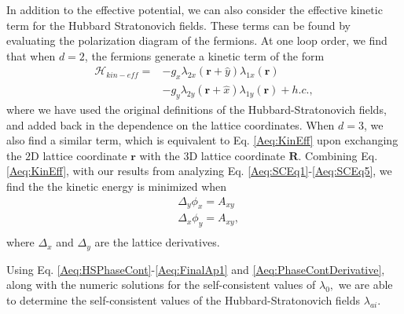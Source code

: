\documentclass[prb,aps,twocolumn,groupaddress,floatfix]{revtex4-1}
\begin{document}
In addition to the effective potential, we can also consider the effective kinetic term for the Hubbard Stratonovich fields. These terms can be found by evaluating the polarization diagram of the fermions. At one loop order, we find that when $d=2$, the fermions generate a kinetic term of the form
\begin{equation}\begin{split}
\mathcal{H}_{kin-eff} = &-g_x \lambda_{2x}(\bm{r}+\hat{y}) \lambda_{1x}(\bm{r}) \\ &- g_y \lambda_{2y}(\bm{r}+\hat{x}) \lambda_{1y}(\bm{r}) + h.c.,
\end{split}\label{Aeq:KinEff}
\end{equation}
where we have used the original definitions of the Hubbard-Stratonovich fields, and added back in the dependence on the lattice coordinates. When $d=3$, we also find a similar term, which is equivalent to Eq. \ref{Aeq:KinEff} upon exchanging the $2$D lattice coordinate $\bm{r}$ with the $3$D lattice coordinate $\bm{R}$. Combining Eq. \ref{Aeq:KinEff}, with our results from analyzing Eq. \ref{Aeq:SCEq1}-\ref{Aeq:SCEq5}, we find the the kinetic energy is minimized when 
\begin{equation}
\begin{split}
&\Delta_y \phi_x = A_{xy}\\
&\Delta_x \phi_y = A_{xy},\\
\end{split}\label{Aeq:PhaseContDerivative}
\end{equation}
where $\Delta_x$ and $\Delta_y$ are the lattice derivatives.

Using Eq. \ref{Aeq:HSPhaseCont}-\ref{Aeq:FinalAp1} and \ref{Aeq:PhaseContDerivative}, along with the numeric solutions for the self-consistent values of $\lambda_0,$ we are able to determine the self-consistent values of the Hubbard-Stratonovich fields $\lambda_{ai}$. 
\end{document}
